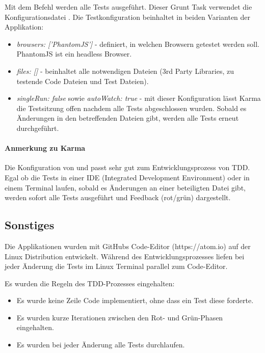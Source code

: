 Mit dem Befehl  werden alle Tests ausgeführt. Dieser Grunt Task verwendet die Konfigurationsdatei .
Die Testkonfiguration beinhaltet in beiden Varianten der Applikation:
\begin{itemize}
  \item \textit{browsers: ['PhantomJS']} - definiert, in welchen Browsern getestet werden soll. PhantomJS ist ein headless Browser.
  \item \textit{files: []} - beinhaltet alle notwendigen Dateien (3rd Party Libraries, zu testende Code Dateien und Test Dateien).
  \item \textit{singleRun: false} sowie \textit{autoWatch: true} - mit dieser Konfiguration lässt Karma die Testsitzung offen nachdem alle Tests abgeschlossen wurden. Sobald es Änderungen in den betreffenden Dateien gibt, werden alle Tests erneut durchgeführt.
\end{itemize}

\paragraph{Anmerkung zu Karma}
Die Konfiguration von  und  passt sehr gut zum Entwicklungsprozess von TDD. Egal ob die Tests in einer IDE (Integrated Development Environment) oder in einem Terminal laufen, sobald es Änderungen an einer beteiligten Datei gibt, werden sofort alle Tests ausgeführt und Feedback (rot/grün) dargestellt.

\subsection{Sonstiges}
Die Applikationen wurden mit GitHubs Code-Editor  (https://atom.io) auf der Linux Distribution  entwickelt. Während des Entwicklungsprozesses liefen bei jeder Änderung die Tests im Linux Terminal parallel zum Code-Editor.

Es wurden die Regeln des TDD-Prozesses eingehalten:
\begin{itemize}
  \item Es wurde keine Zeile Code implementiert, ohne dass ein Test diese forderte.
  \item Es wurden kurze Iterationen zwischen den Rot- und Grün-Phasen eingehalten.
  \item Es wurden bei jeder Änderung alle Tests durchlaufen.
\end{itemize}

